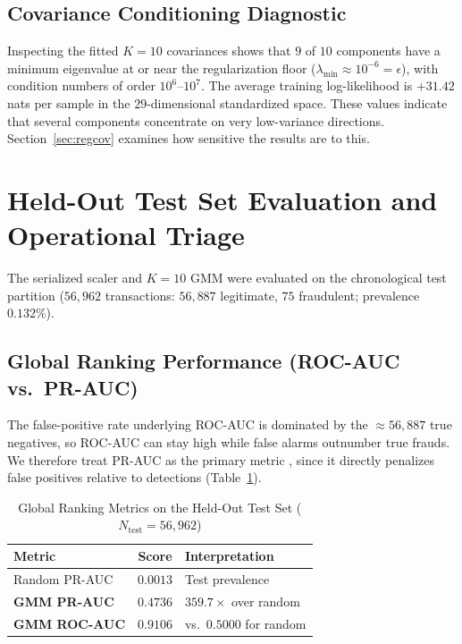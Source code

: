 \documentclass[conference]{IEEEtran}
\begin{document}
\subsection{Covariance Conditioning Diagnostic}
Inspecting the fitted $K=10$ covariances shows that $9$ of $10$ components have a minimum eigenvalue at or near the regularization floor ($\lambda_{\min} \approx 10^{-6} = \epsilon$), with condition numbers of order $10^{6}$--$10^{7}$. The average training log-likelihood is $+31.42$ nats per sample in the $29$-dimensional standardized space. These values indicate that several components concentrate on very low-variance directions. Section~\ref{sec:regcov} examines how sensitive the results are to this.

\section{Held-Out Test Set Evaluation and Operational Triage}

The serialized scaler and $K=10$ GMM were evaluated on the chronological test partition ($56{,}962$ transactions: $56{,}887$ legitimate, $75$ fraudulent; prevalence $0.132\%$).

\subsection{Global Ranking Performance (ROC-AUC vs.\ PR-AUC)}
The false-positive rate underlying ROC-AUC is dominated by the $\approx 56{,}887$ true negatives, so ROC-AUC can stay high while false alarms outnumber true frauds. We therefore treat PR-AUC as the primary metric \cite{saito2015}, since it directly penalizes false positives relative to detections (Table~\ref{tab:global_metrics}).

\begin{table}[!t]
\centering
\caption{Global Ranking Metrics on the Held-Out Test Set ($N_{\text{test}} = 56{,}962$)}
\renewcommand{\arraystretch}{1.15}
\footnotesize
\begin{tabular}{lcl}
\toprule
\textbf{Metric} & \textbf{Score} & \textbf{Interpretation} \\
\midrule
Random PR-AUC & $0.0013$ & Test prevalence \\
\textbf{GMM PR-AUC} & $\mathbf{0.4736}$ & $359.7\times$ over random \\
\textbf{GMM ROC-AUC} & $\mathbf{0.9106}$ & vs.\ $0.5000$ for random \\
\bottomrule
\end{tabular}
\label{tab:global_metrics}
\end{table}
\end{document}

